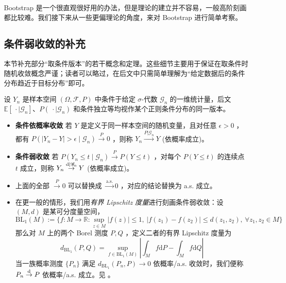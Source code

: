 Bootstrap 是一个很直观很好用的办法，但是理论的建立并不容易，一般高阶刻画都比较难。我们接下来从一些更偏理论的角度，来对 Bootstrap 进行简单考察。

\subsection{条件弱收敛的补充}

本节补充部分``取条件版本''的若干概念和定理。这些细节主要用于保证在取条件时随机收敛概念严谨；读者可以略过，在后文中只需简单理解为``给定数据后的条件分布趋近于目标分布''即可。

\begin{definition*}[条件依概率收敛与条件弱收敛]
设 $Y_n$ 是样本空间 $(\Omega,\mathscr F,P)$ 中条件于给定 $\sigma$-代数 $\mathscr G_n$ 的一维统计量，后文 $\mathbb E[\ \cdot \mid \mathscr G_n]$、$P(\ \cdot\mid \mathscr G_n)$ 和条件独立等均视作某个正则条件分布的同一版本。

\begin{itemize}
\tightlist
\item
  \textbf{条件依概率收敛} 若 $Y$ 是定义于同一样本空间的随机变量，且对任意 $\epsilon>0$ ，都有 $P(|Y_n-Y|>\epsilon \mid \mathscr G_n)\overset{ P}\to 0$ ，则称 $Y_n\overset{P|\mathscr G_n}\to Y$ (依概率成立)。
\item
  \textbf{条件弱收敛} 若 $P(Y_n\le t\mid \mathscr G_n)\overset{P}\to P(Y\le t)$ ，对每个 $P(Y\le t)$ 的连续点 $t$ 成立，则称 $Y_n\overset{\rm d|\mathscr G_n}\to Y$ (依概率成立)。
\end{itemize}
\end{definition*}

\begin{remark}

\begin{itemize}
\tightlist
\item
  上面的全部 $\overset{P}\to 0$ 可以替换成 $\overset{\text{a.s.}}\to 0$ ，对应的结论替换为 a.s. 成立。
\item
  在更一般的情形，我们用\emph{有界 Lipschitz 度量}进行刻画条件弱收敛：设 $(M,d)$ 是某可分度量空间，\[ \mathrm{BL}_1(M):=\Big\{f:M\to\mathbb R:\sup_{z\in M}|f(z)|\le 1,\ |f(z_1)-f(z_2)|\le d(z_1,z_2),\ \forall z_1,z_2\in M\Big\} \]那么对 $M$ 上的两个 Borel 测度 $P,Q$ ，定义二者的有界 Lipschitz 度量为
  $$d_{\mathrm{BL}_1}(P,Q)=\sup_{f\in\mathrm{BL}_1(M)}\left|\int_Mf\mathrm dP-\int_M f\mathrm dQ\right|$$
  当一族概率测度 $\{P_n\}$ 满足 $d_{\mathrm{BL}_1}(P_n,P)\to 0$ 依概率/a.s. 收敛时，我们便称 $P_n\overset{\rm d}\to P$ 依概率/a.s. 成立。见 \cite[1.12 节]{vandervaartwellner1996}。%
\end{itemize}
\end{remark}

